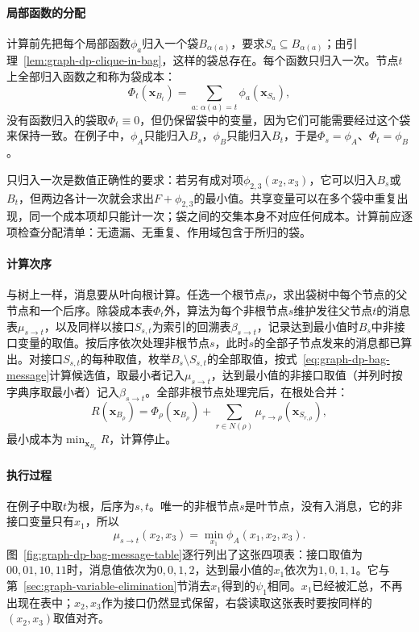 \paragraph{局部函数的分配}
计算前先把每个局部函数$\phi_a$归入一个袋$B_{\alpha(a)}$，要求$S_a\subseteq B_{\alpha(a)}$；由引理~\ref{lem:graph-dp-clique-in-bag}，这样的袋总存在。每个函数只归入一次。节点$t$上全部归入函数之和称为袋成本：
\begin{equation}
\Phi_t(\bm x_{B_t})=\sum_{a:\,\alpha(a)=t}\phi_a(\bm x_{S_a}),
\label{eq:graph-dp-bag-cost}
\end{equation}
没有函数归入的袋取$\Phi_t\equiv0$，但仍保留袋中的变量，因为它们可能需要经过这个袋来保持一致。在例子中，$\phi_A$只能归入$B_s$，$\phi_B$只能归入$B_t$，于是$\Phi_s=\phi_A$、$\Phi_t=\phi_B$。

只归入一次是数值正确性的要求：若另有成对项$\phi_{2,3}(x_2,x_3)$，它可以归入$B_s$或$B_t$，但两边各计一次就会求出$F+\phi_{2,3}$的最小值。共享变量可以在多个袋中重复出现，同一个成本项却只能计一次；袋之间的交集本身不对应任何成本。计算前应逐项检查分配清单：无遗漏、无重复、作用域包含于所归的袋。

\paragraph{计算次序}
与树上一样，消息要从叶向根计算。任选一个根节点$\rho$，求出袋树中每个节点的父节点和一个后序。除袋成本表$\Phi_t$外，算法为每个非根节点$s$维护发往父节点$t$的消息表$\mu_{s\to t}$，以及同样以接口$S_{s,t}$为索引的回溯表$\beta_{s\to t}$，记录达到最小值时$B_s$中非接口变量的取值。按后序依次处理非根节点$s$，此时$s$的全部子节点发来的消息都已算出。对接口$S_{s,t}$的每种取值，枚举$B_s\setminus S_{s,t}$的全部取值，按式~\eqref{eq:graph-dp-bag-message}计算候选值，取最小者记入$\mu_{s\to t}$，达到最小值的非接口取值（并列时按字典序取最小者）记入$\beta_{s\to t}$。全部非根节点处理完后，在根处合并：
\[
R(\bm x_{B_\rho})=\Phi_\rho(\bm x_{B_\rho})+\sum_{r\in N(\rho)}\mu_{r\to\rho}(\bm x_{S_{r,\rho}}),
\]
最小成本为$\min_{\bm x_{B_\rho}}R$，计算停止。

\paragraph{执行过程}
在例子中取$t$为根，后序为$s,t$。唯一的非根节点$s$是叶节点，没有入消息，它的非接口变量只有$x_1$，所以
\[
\mu_{s\to t}(x_2,x_3)=\min_{x_1}\phi_A(x_1,x_2,x_3).
\]
图~\ref{fig:graph-dp-bag-message-table}逐行列出了这张四项表：接口取值为$00,01,10,11$时，消息值依次为$0,0,1,2$，达到最小值的$x_1$依次为$1,0,1,1$。它与第~\ref{sec:graph-variable-elimination}节消去$x_1$得到的$\psi_1$相同。$x_1$已经被汇总，不再出现在表中；$x_2,x_3$作为接口仍然显式保留，右袋读取这张表时要按同样的$(x_2,x_3)$取值对齐。


